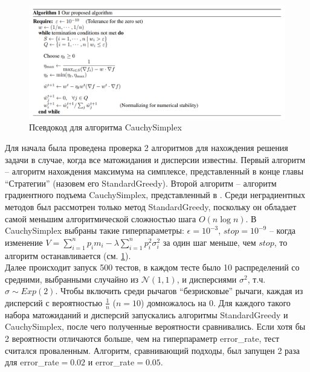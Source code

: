 \documentclass{article}
\begin{document}
\begin{figure}[h] %
\centering
\includegraphics[width=6in]{theory_tester/theory_images/cauchy_simplex.png}
\caption{Псевдокод для алгоритма CauchySimplex}
\label{fig:cauchy_simplex_pseudocode}
\end{figure}

Для начала была проведена проверка 2 алгоритмов для нахождения решения задачи в случае, когда все матожидания и дисперсии известны. Первый алгоритм -- алгоритм нахождения максимума на симплексе, представленный в конце главы ``Стратегии'' (назовем его StandardGreedy). Второй алгоритм -- алгоритм градиентного подъема CauchySimplex, представленный в \cite{cauchy_simplex}. Среди неградиентных методов был рассмотрен только метод StandardGreedy, поскольку он обладает самой меньшим алгоритмической сложностью шага $O(n \log n)$. В CauchySimplex выбраны такие гиперпараметры: $\epsilon = 10^{-3}$, $stop = 10^{-9}$ -- когда изменение $V = \sum_{i=1}^n p_i m_i - \lambda \sum_{i=1}^n p_i^2 \sigma_i^2$ за один шаг меньше, чем $stop$, то алгоритм останавливается (см. \ref{fig:cauchy_simplex_pseudocode}). \\

Далее происходит запуск 500 тестов, в каждом тесте было 10 распределений со средними, выбранными случайно из $\mathcal{N}(1,1)$, и дисперсиями $\sigma^2$, т.ч. $\sigma \sim Exp(2)$.  Чтобы включить среди рычагов ``безрисковые'' рычаги, каждая из дисперсий с вероятностью $\frac{1}{n}$ ($n=10$) домножалось на 0. Для каждого такого набора матожиданий и дисперсий запускались алгоритмы StandardGreedy и CauchySimplex, после чего полученные вероятности сравнивались. Если хотя бы 2 вероятности отличаются больше, чем на гиперпараметр error\_rate, тест считался проваленным. Алгоритм, сравнивающий подходы, был запущен 2 раза для error\_rate$=0.02$ и error\_rate$=0.05$. \\
\end{document}
